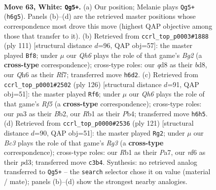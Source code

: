 \documentclass[11pt]{article}
\begin{document}
\clearpage

\begin{figure}[p]\centering
\begin{subfigure}{0.46\textwidth}\centering
\resizebox{\linewidth}{!}{%
\newchessgame
\chessboard[
  setfen={3q2k1/5p2/b2P1n1Q/7n/2p4P/p1B2pP1/P7/1R4K1 w - - 6 63},
  showmover=false,
  pgfstyle=straightmove, color=movearrow, markmove={h6-g5}
]}
\caption{}
\end{subfigure}\hfill
\begin{subfigure}{0.46\textwidth}\centering
\resizebox{\linewidth}{!}{%
\newchessgame
\chessboard[
  setfen={1k1B4/5rb1/3p1Np1/1p1P2Pp/pP5P/7b/1P2K3/2R5 b - - 22 56},
  showmover=false,
  pgfstyle=straightmove, color=movearrow, markmove={g7-f8}
]}
\caption{}
\end{subfigure}
\\[4pt]
\begin{subfigure}{0.46\textwidth}\centering
\resizebox{\linewidth}{!}{%
\newchessgame
\chessboard[
  setfen={8/1b6/2k1n2p/5Rp1/1Pp2n2/2P2P2/1B4PK/8 w - - 4 64},
  showmover=false,
  pgfstyle=straightmove, color=movearrow, markmove={f5-f6}
]}
\caption{}
\end{subfigure}\hfill
\begin{subfigure}{0.46\textwidth}\centering
\resizebox{\linewidth}{!}{%
\newchessgame
\chessboard[
  setfen={8/p5k1/6r1/2p1p3/4N3/PP1P1q2/2K2P2/4Q3 b - - 0 61},
  showmover=false,
  pgfstyle=straightmove, color=movearrow, markmove={g6-g2}
]}
\caption{}
\end{subfigure}
\caption{\textbf{Move 63, White: \texttt{Qg5+}.} (a) Our position; Melanie plays \texttt{Qg5+} (\texttt{h6g5}). Panels (b)--(d) are the retrieved master positions whose correspondence most drove this move (highest QAP objective among those that transfer to it). (b) Retrieved from \texttt{ccrl\_top\_p0003\#1888} (ply 111) [structural distance $d$=96, QAP obj=57]: the master played \texttt{Bf8}; under $\mu$ our \emph{Qh6} plays the role of that game's \emph{Bg2} (a \textbf{cross-type} correspondence); cross-type roles: our \emph{q}d8 as their \emph{b}d8, our \emph{Q}h6 as their \emph{R}f7; transferred move \texttt{h6d2}. (c) Retrieved from \texttt{ccrl\_top\_p0001\#2502} (ply 126) [structural distance $d$=91, QAP obj=51]: the master played \texttt{Rf6}; under $\mu$ our \emph{Qh6} plays the role of that game's \emph{Rf5} (a \textbf{cross-type} correspondence); cross-type roles: our \emph{p}a3 as their \emph{B}b2, our \emph{R}b1 as their \emph{P}b4; transferred move \texttt{h6h5}. (d) Retrieved from \texttt{ccrl\_top\_p0000\#2536} (ply 121) [structural distance $d$=90, QAP obj=51]: the master played \texttt{Rg2}; under $\mu$ our \emph{Bc3} plays the role of that game's \emph{Rg3} (a \textbf{cross-type} correspondence); cross-type roles: our \emph{R}b1 as their \emph{P}a7, our \emph{n}f6 as their \emph{p}d3; transferred move \texttt{c3b4}. Synthesis: no retrieved analog transferred to \texttt{Qg5+} -- the \texttt{search} selector chose it on value (material / mate); panels (b)--(d) show the strongest nearby analogies.}
\label{fig:thought-m124}
\end{figure}
\end{document}
